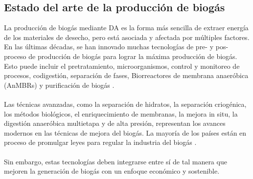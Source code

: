 \documentclass[a4paper,11pt]{article}
\begin{document}
\subsection{Estado del arte de la producción de biogás}
La producción de biogás mediante DA es la forma más sencilla de extraer energía de los materiales de desecho, pero está asociada y afectada por múltiples factores. En las últimas décadas, se han innovado muchas tecnologías de pre- y pos- proceso de producción de biogás para lograr la máxima producción de biogás. Esto puede incluir el pretratamiento, microorganismos, control y monitoreo de procesos, codigestión, separación de fases, Biorreactores de membrana anaeróbica (AnMBRs) y purificación de biogás \cite{Maurya2019}.
\\\\
Las técnicas avanzadas, como la separación de hidratos, la separación criogénica, los métodos biológicos, el enriquecimiento de membranas, la mejora in situ, la digestión anaeróbica multietapa y de alta presión, representan los avances modernos en las técnicas de mejora del biogás. La mayoría de los países están en proceso de promulgar leyes para regular la industria del biogás \cite{Korbag2020}.
\\\\
Sin embargo, estas tecnologías deben integrarse entre sí de tal manera que mejoren la generación de biogás con un enfoque económico y sostenible. 




\end{document}
